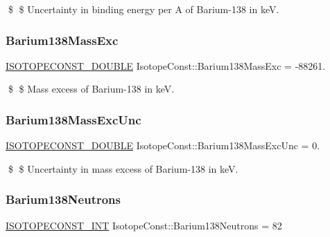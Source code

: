 \$ \$ Uncertainty in binding energy per A of Barium-\/138 in keV. \mbox{\label{group___isotope_const-_barium-_ba138_gaccc7890ba6a8ea2d3902693294f7a9d6}} 
\subsubsection{\texorpdfstring{Barium138\+Mass\+Exc}{Barium138MassExc}}
{\footnotesize\ttfamily \mbox{\hyperlink{group___isotope_const-_macros_ga8f45a7272ce02c0b4c65c44636ed719a}{I\+S\+O\+T\+O\+P\+E\+C\+O\+N\+S\+T\+\_\+\+D\+O\+U\+B\+LE}} Isotope\+Const\+::\+Barium138\+Mass\+Exc = -\/88261.}

\$ \$ Mass excess of Barium-\/138 in keV. \mbox{\label{group___isotope_const-_barium-_ba138_gaaad9bf13acd9e8039f5b913805b39dea}} 
\subsubsection{\texorpdfstring{Barium138\+Mass\+Exc\+Unc}{Barium138MassExcUnc}}
{\footnotesize\ttfamily \mbox{\hyperlink{group___isotope_const-_macros_ga8f45a7272ce02c0b4c65c44636ed719a}{I\+S\+O\+T\+O\+P\+E\+C\+O\+N\+S\+T\+\_\+\+D\+O\+U\+B\+LE}} Isotope\+Const\+::\+Barium138\+Mass\+Exc\+Unc = 0.}

\$ \$ Uncertainty in mass excess of Barium-\/138 in keV. \mbox{\label{group___isotope_const-_barium-_ba138_ga2ac2e367decdf5840aaea6da43a51462}} 
\subsubsection{\texorpdfstring{Barium138\+Neutrons}{Barium138Neutrons}}
{\footnotesize\ttfamily \mbox{\hyperlink{group___isotope_const-_macros_ga5f18360b3e99483a35c32d789e62621c}{I\+S\+O\+T\+O\+P\+E\+C\+O\+N\+S\+T\+\_\+\+I\+NT}} Isotope\+Const\+::\+Barium138\+Neutrons = 82}

